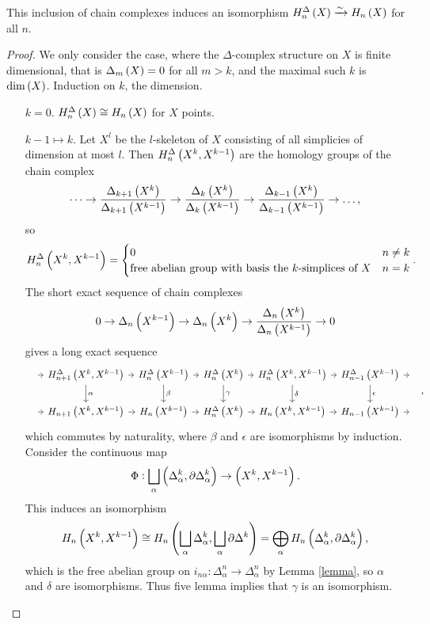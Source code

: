 \begin{theorem}
This inclusion of chain complexes induces an isomorphism $ H_n^\Delta\br{X} \xrightarrow{\sim} H_n\br{X} $ for all $ n $.
\end{theorem}

\begin{proof}
We only consider the case, where the $ \Delta $-complex structure on $ X $ is finite dimensional, that is $ \Delta_m\br{X} = 0 $ for all $ m > k $, and the maximal such $ k $ is $ \dim\br{X} $. Induction on $ k $, the dimension.
\begin{itemize}[leftmargin=2cm]
\item[$ k = 0 $.] $ H_n^\Delta\br{X} \cong H_n\br{X} $ for $ X $ points.
\item[$ k - 1 \mapsto k $.] Let $ X^l $ be the $ l $-skeleton of $ X $ consisting of all simplicies of dimension at most $ l $. Then $ H_n^\Delta\br{X^k, X^{k - 1}} $ are the homology groups of the chain complex
$$ \dots \to \dfrac{\Delta_{k + 1}\br{X^k}}{\Delta_{k + 1}\br{X^{k - 1}}} \to \dfrac{\Delta_k\br{X^k}}{\Delta_k\br{X^{k - 1}}} \to \dfrac{\Delta_{k - 1}\br{X^k}}{\Delta_{k - 1}\br{X^{k - 1}}} \to \dots, $$
so
$$ H_n^\Delta\br{X^k, X^{k - 1}} =
\begin{cases}
0 & n \ne k \\
\text{free abelian group with basis the $ k $-simplices of} \ X & n = k
\end{cases}.
$$
The short exact sequence of chain complexes
$$ 0 \to \Delta_n\br{X^{k - 1}} \to \Delta_n\br{X^k} \to \dfrac{\Delta_n\br{X^k}}{\Delta_n\br{X^{k - 1}}} \to 0 $$
gives a long exact sequence
$$
\begin{tikzcd}[column sep=tiny]
\ \arrow{r} & H_{n + 1}^\Delta\br{X^k, X^{k - 1}} \arrow{r} \arrow{d}{\alpha} & H_n^\Delta\br{X^{k - 1}} \arrow{r} \arrow{d}{\beta} & H_n^\Delta\br{X^k} \arrow{r} \arrow{d}{\gamma} & H_n^\Delta\br{X^k, X^{k - 1}} \arrow{r} \arrow{d}{\delta} & H_{n - 1}^\Delta\br{X^{k - 1}} \arrow{d}{\epsilon} \arrow{r} & \ \\
\ \arrow{r} & H_{n + 1}\br{X^k, X^{k - 1}} \arrow{r} & H_n\br{X^{k - 1}} \arrow{r} & H_n^\Delta\br{X^k} \arrow{r} & H_n\br{X^k, X^{k - 1}} \arrow{r} & H_{n - 1}\br{X^{k - 1}} \arrow{r} & \
\end{tikzcd},
$$
which commutes by naturality, where $ \beta $ and $ \epsilon $ are isomorphisms by induction. Consider the continuous map
$$ \Phi : \bigsqcup_\alpha \br{\Delta_\alpha^k, \partial\Delta_\alpha^k} \to \br{X^k, X^{k - 1}}. $$
This induces an isomorphism
$$ H_n\br{X^k, X^{k - 1}} \cong H_n\br{\bigsqcup_\alpha \Delta_\alpha^k, \bigsqcup_\alpha \partial\Delta^k} = \bigoplus_\alpha H_n\br{\Delta_\alpha^k, \partial\Delta_\alpha^k}, $$
which is the free abelian group on $ i_{n\alpha} : \Delta_\alpha^n \to \Delta_\alpha^n $ by Lemma \ref{lemma}, so $ \alpha $ and $ \delta $ are isomorphisms. Thus five lemma implies that $ \gamma $ is an isomorphism.
\end{itemize}
\end{proof}

